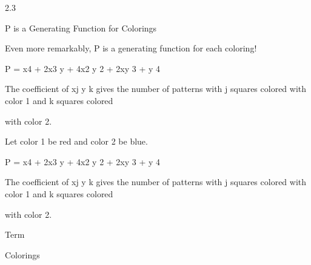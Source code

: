 \documentclass[a4paper,portrait,12pt]{article}
\begin{document}
2.3





\begin{flushleft}
P is a Generating Function for Colorings
\end{flushleft}





\begin{flushleft}
Even more remarkably, P is a generating function for each coloring!
\end{flushleft}





\begin{flushleft}
P = x4 + 2x3 y + 4x2 y 2 + 2xy 3 + y 4
\end{flushleft}


\begin{flushleft}
The coefficient of xj y k gives the number of patterns with j squares colored with color 1 and k squares colored
\end{flushleft}


\begin{flushleft}
with color 2.
\end{flushleft}


\begin{flushleft}
Let color 1 be red and color 2 be blue.
\end{flushleft}





\begin{flushleft}
P = x4 + 2x3 y + 4x2 y 2 + 2xy 3 + y 4
\end{flushleft}


\begin{flushleft}
The coefficient of xj y k gives the number of patterns with j squares colored with color 1 and k squares colored
\end{flushleft}


\begin{flushleft}
with color 2.
\end{flushleft}


\begin{flushleft}
Term
\end{flushleft}





\begin{flushleft}
Colorings
\end{flushleft}
\end{document}
